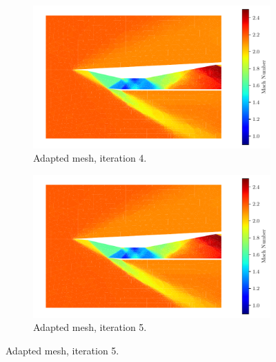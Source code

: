 \begin{figure}[h!]
    \begin{subfigure}[h]{0.49\linewidth}
        \centering
        \includegraphics[width=\linewidth]{rep/q4/Machfield4.pdf}
        \caption{Adapted mesh, iteration 4.}
    \end{subfigure}
    \begin{subfigure}[h]{0.49\linewidth}
        \centering
        \includegraphics[width=\linewidth]{rep/q4/Machfield5.pdf}
        \caption{Adapted mesh, iteration 5.}
    \end{subfigure}
\end{figure}


